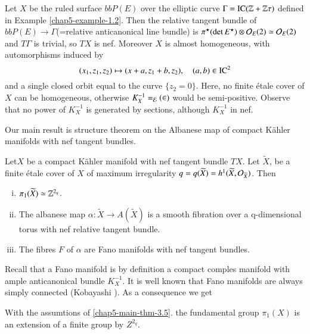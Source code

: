 \begin{secexam}\label{chap5-example-3.4}
Let $X$ be the ruled surface $bbP(E)$ over the elliptic curve $\Gamma = \operatorname{IC}(\mathbb{Z} + \mathbb{Z}\tau)$ defined in Example
\ref{chap5-example-1.2}. Then the relative tangent bundle of $bbP(E)\rightarrow \Gamma$(=relative anticanonical line bundle) is $\pi^{\star}(\det E^{\star})\otimes \mathcal{O}_{E}(2) \simeq \mathcal{O}_{E}(2)$ and $T\Gamma$ is trivial, so $TX$ is nef. Moreover $X$ is almost homogeneous, with automorphisms induced by
$$
(x_{1}, z_{1}, z_{2}) \mapsto (x+a, z_{1}+b, z_{2}),\quad (a,b) \in \operatorname{IC}^{2}
$$ 
and a single closed orbit equal to the curve $\{z_{2}=0\}$. Here, no finite \'etale cover of $X$ can be homogeneous, otherwise $K_{X}^{-1} = \cal_{E}(2)$ would be semi-positive. Observe that no power of $K_{X}^{-1}$ is generated by sections, although $K_{X}^{-1}$ in nef.
\end{secexam}

Our main result is structure theorem on the Albanese map of compact K\"ahler manifolds with nef tangent bundles.

\begin{secmaintheorem}\label{chap5-main-thm-3.5}
Let\pageoriginale $X$ be a compact K\"ahler manifold with nef tangent bundle $TX$. Let $\widetilde{X}$, be a finite \'etale cover of $X$ of maximum irregularity $q=q(\widetilde{X}) = h^{1}(\widetilde{X}, \mathcal{O}_{\widetilde{X}})$. Then
    \begin{enumerate}[(i)]
        \item $\pi_{1}(\widetilde{X}) \simeq \mathbb{Z}^{2_{q}}$.\label{chap5-enum_(i)}
        \item The albanese map $\alpha : \widetilde{X} \rightarrow A(\widetilde{X})$ is a smooth fibration over a q-dimensional torus with nef relative tangent bundle. \label{chap5-enum_(ii)}
        \item The fibres $F$ of $\alpha$ are Fano manifolds with nef tangent bundles.\label{chap5-enum_(iii)}
    \end{enumerate}
\end{secmaintheorem}

Recall that  a Fano manifold is by definition a compact comples manifold with ample anticanonical bundle $K_{X}^{-1}$. It is well known that Fano manifolds are always simply connected (Kobayashi \cite{chap5-keyKo61}). As a consequence we get 

\begin{seccoro}\label{chap5-coro-3.6}
With the assumtions of \ref{chap5-main-thm-3.5}. the fundamental group $\pi_{1}(X)$ is an extension of a finite group by $Z^{2_{q}}$.
\end{seccoro}

